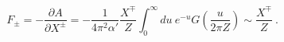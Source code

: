 \begin{equation}
  F_\pm = -\frac{\partial A}{\partial X^\pm} 
  = -\frac{1}{4\pi^2\alpha'} \frac{X^\mp}{Z} \int_0^\infty
  du~e^{-u}G\left(\frac{u}{2\pi Z}\right) 
  \sim \frac{X^\mp}{Z}\ .
\end{equation}


